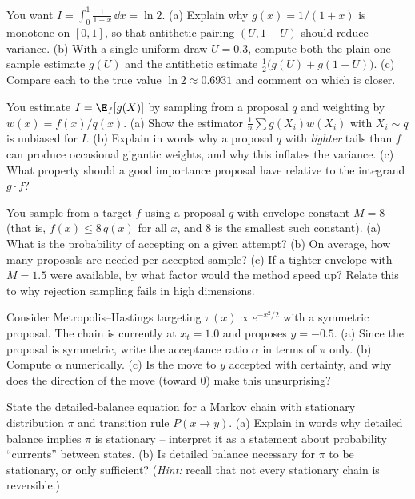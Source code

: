 \begin{exercise}
\label{ch35:exr-antithetic}
You want $I = \int_0^1 \frac{1}{1+x}\,\dd x = \ln 2$. (a) Explain why
$g(x) = 1/(1+x)$ is monotone on $[0,1]$, so that antithetic pairing $(U, 1-U)$
should reduce variance. (b) With a single uniform draw $U = 0.3$, compute both the
plain one-sample estimate $g(U)$ and the antithetic estimate
$\frac12\bigl(g(U) + g(1-U)\bigr)$. (c) Compare each to the true value
$\ln 2 \approx 0.6931$ and comment on which is closer.
\end{exercise}

\begin{exercise}
\label{ch35:exr-importance}
You estimate $I = \E_f[g(X)]$ by sampling from a proposal $q$ and weighting by
$w(x) = f(x)/q(x)$. (a) Show the estimator $\frac1n\sum g(X_i)w(X_i)$ with
$X_i \sim q$ is unbiased for $I$. (b) Explain in words why a proposal $q$ with
\emph{lighter} tails than $f$ can produce occasional gigantic weights, and why
this inflates the variance. (c) What property should a good importance proposal
have relative to the integrand $g\cdot f$?
\end{exercise}

\begin{exercise}
\label{ch35:exr-rejection}
You sample from a target $f$ using a proposal $q$ with envelope constant $M = 8$
(that is, $f(x) \le 8\,q(x)$ for all $x$, and $8$ is the smallest such constant).
(a) What is the probability of accepting on a given attempt? (b) On average, how
many proposals are needed per accepted sample? (c) If a tighter envelope with
$M = 1.5$ were available, by what factor would the method speed up? Relate this to
why rejection sampling fails in high dimensions.
\end{exercise}

\begin{exercise}
\label{ch35:exr-mh-ratio}
Consider Metropolis--Hastings targeting $\pi(x) \propto e^{-x^2/2}$ with a
symmetric proposal. The chain is currently at $x_t = 1.0$ and proposes
$y = -0.5$. (a) Since the proposal is symmetric, write the acceptance ratio
$\alpha$ in terms of $\pi$ only. (b) Compute $\alpha$ numerically. (c) Is the
move to $y$ accepted with certainty, and why does the direction of the move
(toward $0$) make this unsurprising?
\end{exercise}

\begin{exercise}
\label{ch35:exr-detailed-balance}
State the detailed-balance equation for a Markov chain with stationary
distribution $\pi$ and transition rule $P(x\to y)$. (a) Explain in words why
detailed balance implies $\pi$ is stationary -- interpret it as a statement about
probability ``currents'' between states. (b) Is detailed balance necessary for
$\pi$ to be stationary, or only sufficient? (\emph{Hint:} recall that not every
stationary chain is reversible.)
\end{exercise}

